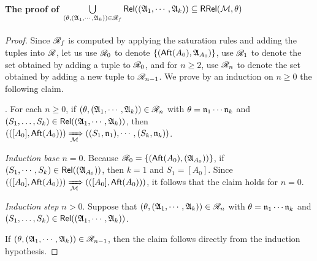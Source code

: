 \paragraph*{The proof of $\bigcup \limits_{(\theta, ({\mathfrak{A} }_1, \cdots, {\mathfrak{A} }_k)) \in \mathscr{R}_f}  \mathsf{Rel}(({\mathfrak{A} }_1, \cdots, {\mathfrak{A} }_k)) \subseteq \mathsf{RRel}({\mathcal{M} }, \theta)$}


\begin{proof}
Since $\mathscr{R}_f$ is computed by applying the saturation rules and adding the tuples into $\mathscr{R}$,  let us use $\mathscr{R}_0$ to denote $\{({\sf Aft}(A_0), {\mathfrak{A} }_{A_0})\}$, use $\mathscr{R}_1$ to denote the set obtained by adding a tuple to $\mathscr{R}_0$, and for $n \ge 2$, use $\mathscr{R}_n$ to denote the set obtained by adding a new tuple to $\mathscr{R}_{n-1}$. 
We prove by an induction on $n \ge 0$ the following claim.  

\smallskip
{}. For each $n \ge 0$, if $(\theta, ({\mathfrak{A} }_1, \cdots, {\mathfrak{A} }_k)) \in \mathscr{R}_n$ with $\theta = \mathfrak{n}_1 \cdots \mathfrak{n}_k$ and $(S_1,\dots,S_k) \in \mathsf{Rel}(({\mathfrak{A} }_1, \cdots, {\mathfrak{A} }_k))$, then $(([A_0], {\sf Aft}(A_0))) \xRightarrow[{\mathcal{M} }]{} ((S_1, \mathfrak{n}_1), \cdots, (S_k, \mathfrak{n}_k))$.

\smallskip



\noindent \emph{Induction base $n = 0$}. 
Because $\mathscr{R}_0 = \{({\sf Aft}(A_0),({\mathfrak{A} }_{A_0}))\}$, if $(S_1, \cdots, S_k) \in \mathsf{Rel}(({\mathfrak{A} }_{A_0}))$, then $k=1$ and $S_1 = [A_0]$. Since $(([A_0], {\sf Aft}(A_0))) \xRightarrow[{\mathcal{M} }]{} (([A_0], {\sf Aft}(A_0)))$, it follows that the claim holds for $n = 0$. 

\smallskip

\noindent \emph{Induction step $n > 0$}. 
Suppose that $(\theta, ({\mathfrak{A} }_1, \cdots, {\mathfrak{A} }_k)) \in \mathscr{R}_n$ with $\theta = \mathfrak{n}_1 \cdots \mathfrak{n}_k$ and $(S_1,\dots,S_k) \in \mathsf{Rel}(({\mathfrak{A} }_1, \cdots, {\mathfrak{A} }_k))$. 

If $(\theta, ({\mathfrak{A} }_1, \cdots, {\mathfrak{A} }_k)) \in \mathscr{R}_{n-1}$, then the claim follows directly from the induction hypothesis. 


\end{proof}
